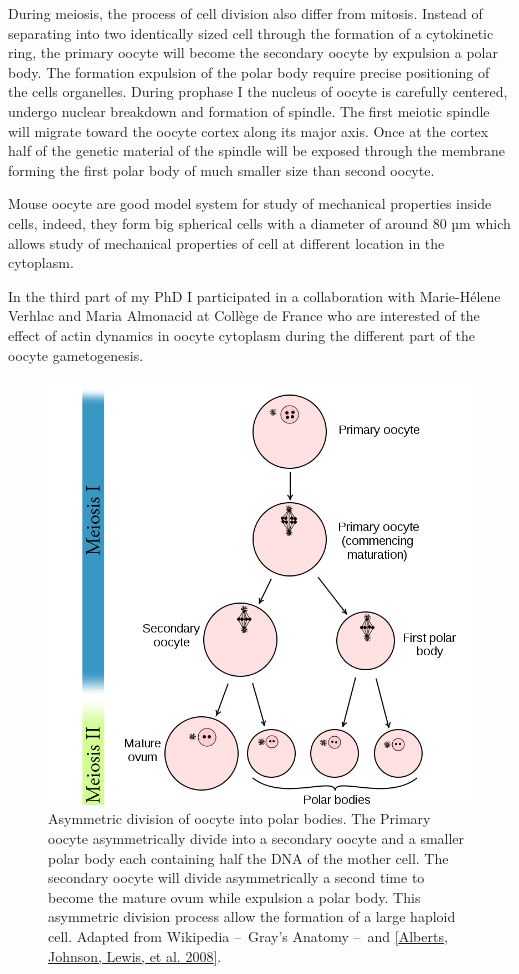 \documentclass[A4paperpaper,11pt,english]{sphinxmanual}
\begin{document}
During meiosis, the process of cell division also differ from mitosis. Instead
of separating into two identically sized cell through the formation of a
cytokinetic ring, the primary oocyte will become the secondary oocyte by
expulsion a polar body. The formation expulsion of the polar body require
precise positioning of the cells organelles. During prophase I the nucleus of
oocyte is carefully centered, undergo nuclear breakdown and formation of
spindle. The first meiotic spindle will migrate toward the oocyte cortex along
its major axis. Once at the cortex half of the genetic material of the spindle
will be exposed through the membrane forming the first polar body of much
smaller size than second oocyte.

Mouse oocyte are good model system for study of mechanical properties inside
cells, indeed,  they form big spherical cells with a diameter of around 80 µm
which allows study of mechanical properties of cell at different location in
the cytoplasm.

In the third part of my PhD I participated in a collaboration with Marie-Hélene
Verhlac and Maria Almonacid at Collège de France who are interested of the
effect of actin dynamics in oocyte cytoplasm during the different part of the
oocyte gametogenesis.
\begin{figure}[htbp]
\centering
\capstart

\includegraphics[width=0.800\linewidth]{oocyte-polar.png}
\caption{Asymmetric division of oocyte into polar bodies. The Primary oocyte
asymmetrically divide into a secondary oocyte and a smaller polar body each
containing half the DNA of the mother cell. The secondary oocyte will
divide asymmetrically a second time to become the mature ovum while
expulsion a polar body. This asymmetric division process allow the
formation of a large haploid cell. Adapted from Wikipedia – Gray's
Anatomy – and {\hyperref[parts/part1:alberts2008]{{[}Alberts, Johnson, Lewis,  et al.  2008{]}}}.}\label{parts/part1:fig-asymetric-division}\end{figure}
\end{document}
